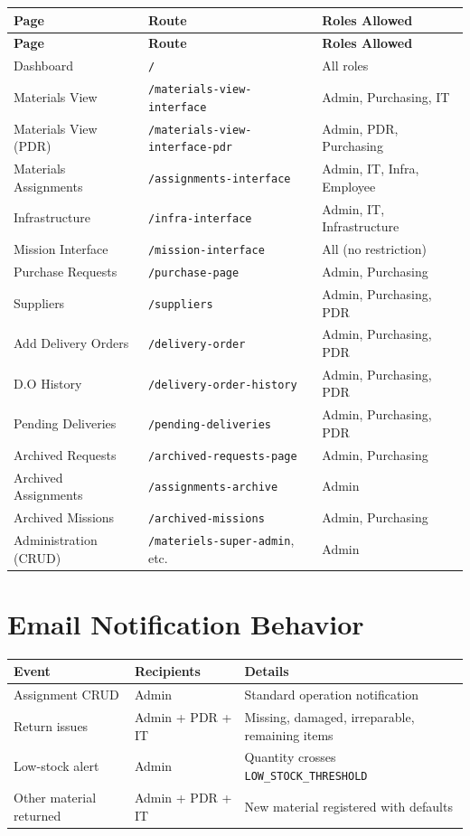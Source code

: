 \documentclass[11pt,a4paper]{article}
\begin{document}
\begin{longtable}{| l | l | l |}
\hline
\textbf{Page} & \textbf{Route} & \textbf{Roles Allowed} \\
\hline
\endfirsthead
\hline
\textbf{Page} & \textbf{Route} & \textbf{Roles Allowed} \\
\hline
\endhead
Dashboard & \texttt{/} & All roles \\
\hline
Materials View & \texttt{/materials-view-interface} & Admin, Purchasing, IT \\
\hline
Materials View (PDR) & \texttt{/materials-view-interface-pdr} & Admin, PDR, Purchasing \\
\hline
Materials Assignments & \texttt{/assignments-interface} & Admin, IT, Infra, Employee \\
\hline
Infrastructure & \texttt{/infra-interface} & Admin, IT, Infrastructure \\
\hline
Mission Interface & \texttt{/mission-interface} & All (no restriction) \\
\hline
Purchase Requests & \texttt{/purchase-page} & Admin, Purchasing \\
\hline
Suppliers & \texttt{/suppliers} & Admin, Purchasing, PDR \\
\hline
Add Delivery Orders & \texttt{/delivery-order} & Admin, Purchasing, PDR \\
\hline
D.O History & \texttt{/delivery-order-history} & Admin, Purchasing, PDR \\
\hline
Pending Deliveries & \texttt{/pending-deliveries} & Admin, Purchasing, PDR \\
\hline
Archived Requests & \texttt{/archived-requests-page} & Admin, Purchasing \\
\hline
Archived Assignments & \texttt{/assignments-archive} & Admin \\
\hline
Archived Missions & \texttt{/archived-missions} & Admin, Purchasing \\
\hline
Administration (CRUD) & \texttt{/materiels-super-admin}, etc. & Admin \\
\hline
\end{longtable}

\section{Email Notification Behavior}

\begin{longtable}{| l | l | p{6cm} |}
\hline
\textbf{Event} & \textbf{Recipients} & \textbf{Details} \\
\hline
\endfirsthead
Assignment CRUD & Admin & Standard operation notification \\
\hline
Return issues & Admin + PDR + IT & Missing, damaged, irreparable, remaining items \\
\hline
Low-stock alert & Admin & Quantity crosses \texttt{LOW\_STOCK\_THRESHOLD} \\
\hline
Other material returned & Admin + PDR + IT & New material registered with defaults \\
\hline
\end{longtable}
\end{document}
